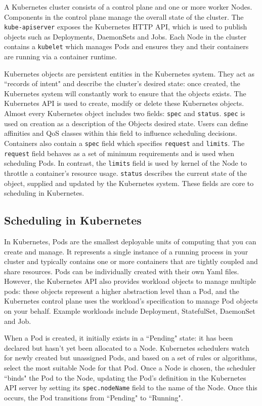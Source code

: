 A Kubernetes cluster consists of a control plane and one or more worker Nodes.
Components in the control plane manage the overall state of the cluster. The
\verb|kube-apiserver| exposes the Kubernetes HTTP API, which is used to publish
objects such as Deployments, DaemonSets and Jobs. Each
Node in the cluster contains a \verb|kubelet| which manages Pods and ensures
they and their containers are running via a container runtime.

Kubernetes objects are persistent entities in the Kubernetes system. They act as
``records of intent" and describe the cluster's desired state: once created, the
Kubernetes system will constantly work to ensure that the objects exists. The
Kubernetes API is used to create, modify or delete these Kubernetes objects. Almost
every Kubernetes object includes two fields: \verb|spec| and \verb|status|.
\verb|spec| is used on creation as a description of the Objects desired state.
Users can define affinities and QoS classes within this field to influence
scheduling decisions. Containers also contain a \verb|spec| field which
specifies \verb|request| and \verb|limits|. The \texttt{request} field behaves
as a set of minimum requirements and is used when scheduling Pods. In contrast,
the \texttt{limits} field is used by kernel of the Node to throttle a
container's resource usage. \verb|status| describes the current state of the
object, supplied and updated by the Kubernetes system. These fields are core to
scheduling in Kubernetes.

\subsection{Scheduling in Kubernetes}
In Kubernetes, Pods are the smallest deployable units of computing that you can
create and manage. It represents a single instance of a running
process in your cluster and typically contains one or more containers that are
tightly coupled and share resources. Pods can be individually created with their
own Yaml files. However, the Kubernetes API also provides workload objects to
manage multiple pods: these objects represent a higher abstraction level than a
Pod, and the Kubernetes control plane uses the workload's specification to
manage Pod objects on your behalf. Example workloads include Deployment,
StatefulSet, DaemonSet and Job.

When a Pod is created, it initially exists in a ``Pending" state: it has been
declared but hasn't yet been allocated to a Node. Kubernetes schedulers watch for
newly created but unassigned Pods, and based on a set of
rules or algorithms, select the most suitable Node for that Pod. Once a Node is
chosen, the scheduler ``binds" the Pod to the Node, updating the Pod's definition
in the Kubernetes API server by setting its \verb|spec.nodeName| field to the
name of the Node. Once this occurs, the Pod transitions from ``Pending" to
``Running".

